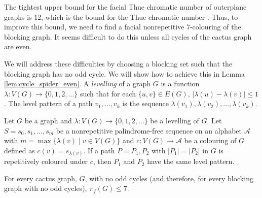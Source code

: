 \documentclass{patmorin}
\begin{document}
The tightest upper bound for the facial Thue chromatic number of outerplane graphs is 12, which is the bound for the Thue chromatic number \cite{barat2007square, kundgen2008nonrepetitive}. Thus, to improve this bound, we need to find a facial nonrepetitive 7-colouring of the blocking graph. It seems difficult to do this unless all cycles of the cactus graph are even. 

We will address these difficulties by choosing a blocking set such that the blocking graph has no odd cycle. We will show how to achieve this in Lemma \ref{lem:cycle_spider_even}. 
A \emph{levelling} of a graph $G$ is a function $\lambda\colon V(G)\to \{0, 1, 2,\dots\}$ such that for each $\{u,v\}\in E(G)$, $|\lambda(u)-\lambda(v)|\leq 1$. The level pattern of a path $v_1,\ldots,v_k$ is the sequence $\lambda(v_1),\lambda(v_2),\ldots,\lambda(v_k)$.

\begin{lem} 
 Let $G$ be a graph and $\lambda\colon V(G)\to \{0, 1, 2,\dots\}$ be a levelling of $G$. Let $S=s_0,s_1,\ldots,s_m$ be a nonrepetitive palindrome-free sequence on an alphabet $\mathcal{A}$ with $m=\max\{\lambda(v) \;|\; v \in V(G)\}$ and $c : V(G) \rightarrow \mathcal{A}$ be a colouring of $G$ defined as $c(v)=s_{\lambda(v)}$. %
 If a path $P=P_1, P_2$ with $|P_1|=|P_2|$ in $G$ is repetitively coloured under $c$, then $P_1$ and $P_2$ have the same level pattern.
\end{lem}

\begin{lem}
  For every cactus graph, $G$, with no odd cycles (and therefore, for
  every blocking graph with no odd cycles), $\pi_f(G)\le 7$.
\end{lem}
\end{document}
